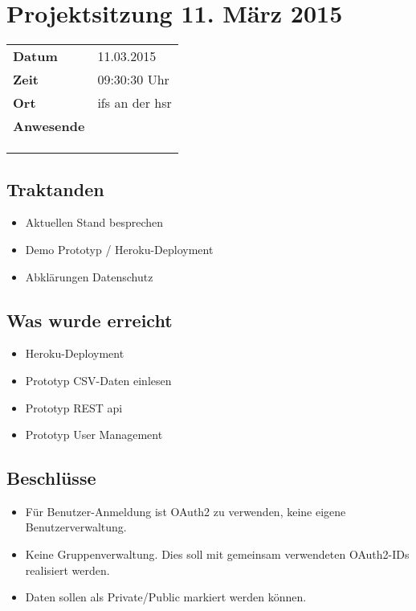\documentclass[class=scrbook,crop=false]{standalone}
\begin{document}
	
	\section{Projektsitzung 11. März 2015}
	
	\begin{tabular}{ll}
		\textbf{Datum} & 11.03.2015 \\
		\textbf{Zeit} & 09:30\textendash10:30 Uhr \\
		\textbf{Ort} & \acs{ifs} an der \acs{hsr} \\
		\textbf{Anwesende} & \proff \\ & \chuf \\ & \rlif \\ & \fscf
	\end{tabular}
	

	\subsection*{Traktanden}
	\begin{itemize}
		\item Aktuellen Stand besprechen
		\item Demo Prototyp / Heroku-Deployment
		\item Abklärungen Datenschutz
	\end{itemize}
	
	\subsection*{Was wurde erreicht}
	\begin{itemize}
		\item Heroku-Deployment
		\item Prototyp CSV-Daten einlesen
		\item Prototyp REST \acs{api}
		\item Prototyp User Management
	\end{itemize}
	
	\subsection*{Beschlüsse}
	\begin{itemize}
		\item Für Benutzer-Anmeldung ist OAuth2 zu verwenden, keine eigene Benutzerverwaltung.
		\item Keine Gruppenverwaltung. Dies soll mit gemeinsam verwendeten OAuth2-IDs realisiert werden.
		\item Daten sollen als Private/Public markiert werden können.
	\end{itemize}
	
\end{document}
